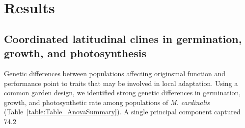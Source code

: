\documentclass[11pt, oneside]{article}\usepackage[]{graphicx}\usepackage[]{color}
\begin{document}

\section*{Results}

\subsection*{Coordinated latitudinal clines in germination, growth, and photosynthesis}

Genetic differences between populations affecting originsmal function and performance point to traits that may be involved in local adaptation. Using a common garden design, we identified strong genetic differences in germination, growth, and photosynthetic rate among populations of \textit{M. cardinalis} (Table~\ref{table:Table_AnovaSummary}). A single principal component captured 74.2 %

\end{document}
